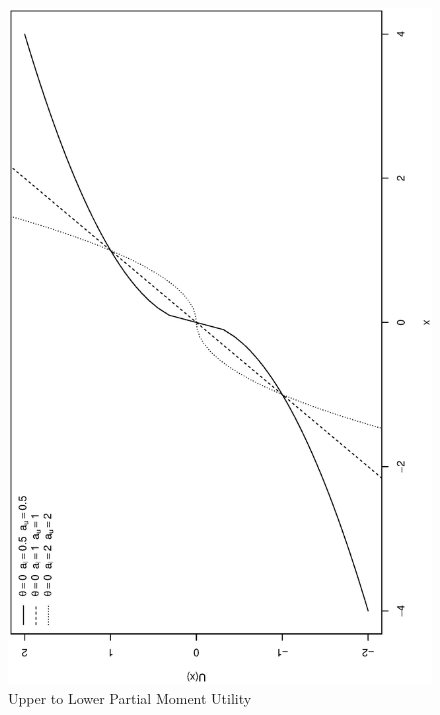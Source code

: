 \begin{figure}
\centering
\includegraphics[scale=0.5,angle=-90]{lpmutility.eps}
\caption[Upper to Lower Partial Moment Utility]{Upper to Lower Partial Moment Utility}\label{fig:lpmutility}
\end{figure} 
